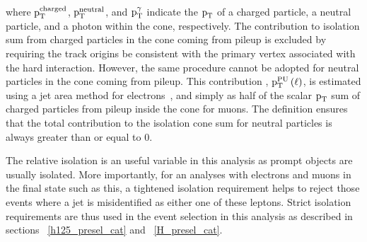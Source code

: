 where $\text{p}_\text{T}^\text{charged}$, $\text{p}_\text{T}^\text{neutral}$, and $\text{p}_\text{T}^{\gamma}$  indicate the $\text{p}_\text{T}$ of a charged particle, a neutral particle, and a photon within the cone, respectively. The contribution to isolation sum from charged particles in the cone coming from pileup is excluded by requiring the track origins be consistent with the primary vertex associated with the hard interaction. However, the same procedure cannot be adopted for neutral particles in the cone coming from pileup. This contribution , $\text{p}_\text{T}^\text{PU}\left(\ell\right)$, is estimated using a jet area method for electrons~\cite{isolation_1,isolation_2}, and simply as half of the scalar $\text{p}_\text{T}$ sum of charged particles from pileup inside the cone for muons. The definition ensures that the total contribution to the isolation cone sum for neutral particles is always greater than or equal to 0. 

The relative isolation is an useful variable in this analysis as prompt objects are usually isolated. More importantly, for an analyses with electrons and muons in the final state such as this, a tightened isolation requirement helps to reject those events where a jet is misidentified as either one of these leptons. Strict isolation requirements are thus used in the event selection in this analysis as described in sections ~\ref{h125_presel_cat} and ~\ref{H_presel_cat}.    




